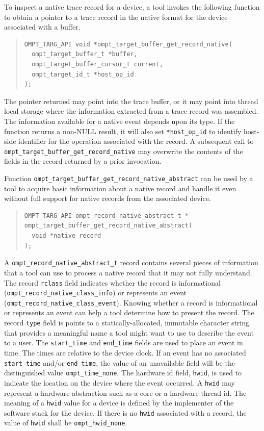 \documentclass{article}
\begin{document}
To inspect a native trace record for a device, a tool invokes the following function to obtain a pointer to a trace record in the native format for the device associated with a buffer. \begin{quote}
\begin{verbatim}
OMPT_TARG_API void *ompt_target_buffer_get_record_native(
  ompt_target_buffer_t *buffer, 
  ompt_target_buffer_cursor_t current,
  ompt_target_id_t *host_op_id
);
\end{verbatim}
\end{quote}
The pointer returned  may point into the trace buffer, or it may point into thread local storage where the information extracted from a trace record was assembled. The information available for a native event depends upon its type. If the function returns a non-NULL result, it will also set \verb|*host_op_id| to identify host-side identifier for the operation associated with the record.
A subsequent call to \verb|ompt_target_buffer_get_record_native| may overwrite the contents of the fields in the record returned by a prior invocation.

Function  \verb|ompt_target_buffer_get_record_native_abstract| can be used by a tool to acquire basic information about a native record and handle it even without full support for  native records from the associated device.
\begin{quote}
\begin{verbatim}
OMPT_TARG_API ompt_record_native_abstract_t *
ompt_target_buffer_get_record_native_abstract(
  void *native_record 
);

\end{verbatim}
\end{quote}
A  \verb|ompt_record_native_abstract_t| record contains several pieces of information that a tool can use to process a native record that it may not fully understand. The record \verb|rclass| field indicates whether the record is informational (\verb|ompt_record_native_class_info|) or represents an event (\verb|ompt_record_native_class_event|). Knowing whether a record is informational or represents an event can help a tool determine how to present the record. The record  \verb|type| field is points to a statically-allocated, immutable character string that provides  a meaningful name  a tool might want to use to describe the event to a user. The \verb|start_time| and \verb|end_time| fields are used to place an event in time. The times are relative to the device clock. If an event has no associated \verb|start_time| and/or \verb|end_time|, the value of an unavailable field will be the distinguished value \verb|ompt_time_none|. The hardware id field, \verb|hwid|,  is used to indicate the location on the device where the event occurred. A \verb|hwid| may represent a hardware abstraction such as a core or a hardware thread id. The meaning of a \verb|hwid| value for a device is defined by the implementer of the software stack for the device. If there is no \verb|hwid| associated with a record, the value of \verb|hwid| shall be \verb|ompt_hwid_none|. 
\end{document}
